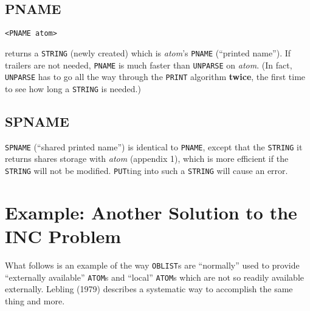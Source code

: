 \documentclass[a4paper]{scrbook}
\begin{document}
\subsection{PNAME}\label{pname}

\begin{verbatim}
<PNAME atom>
\end{verbatim}

 returns a \texttt{STRING} (newly created) which is \emph{atom}'s \texttt{PNAME} (``printed
name''). If trailers are not needed, \texttt{PNAME} is much faster than \texttt{UNPARSE} on
\emph{atom}. (In fact, \texttt{UNPARSE} has to go all the way through the \texttt{PRINT} algorithm \textbf{twice}, the
first time to see how long a \texttt{STRING} is needed.)

\subsection{SPNAME}\label{spname}

 \texttt{SPNAME} (``shared printed name'') is identical to \texttt{PNAME}, except that the
\texttt{STRING} it returns shares storage with \emph{atom} (appendix 1), which is more efficient if the \texttt{STRING}
will not be modified. \texttt{PUT}ting into such a \texttt{STRING} will cause an error.

\section{Example: Another Solution to the INC Problem}\label{example-another-solution-to-the-inc-problem}

What follows is an example of the way \texttt{OBLIST}s are ``normally'' used to provide ``externally available''
\texttt{ATOM}s and ``local'' \texttt{ATOM}s which are not so readily available externally. Lebling (1979) describes a
systematic way to accomplish the same thing and more.
\end{document}
